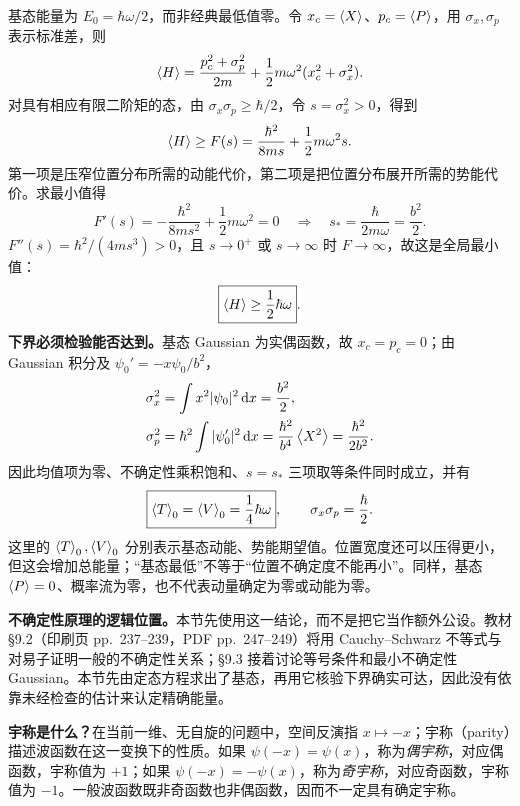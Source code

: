 基态能量为 $E_0=\hbar\omega/2$，而非经典最低值零。令
$x_c=\left\langle X \right\rangle$、$p_c=\left\langle P \right\rangle$，用 $\sigma_x,\sigma_p$ 表示标准差，则
\begin{equation}
  \left\langle H \right\rangle=\frac{p_c^2+\sigma_p^2}{2m}
               +\frac12m\omega^2(x_c^2+\sigma_x^2).
\end{equation}
对具有相应有限二阶矩的态，由 $\sigma_x\sigma_p\ge\hbar/2$，令 $s=\sigma_x^2>0$，得到
\begin{equation}
  \left\langle H \right\rangle\ge F(s)=\frac{\hbar^2}{8ms}+\frac12m\omega^2s.
\end{equation}
第一项是压窄位置分布所需的动能代价，第二项是把位置分布展开所需的势能代价。求最小值得
\begin{equation}
  F'(s)=-\frac{\hbar^2}{8ms^2}+\frac12m\omega^2=0
  \quad\Longrightarrow\quad s_* =\frac{\hbar}{2m\omega}=\frac{b^2}{2}.
\end{equation}
$F''(s)=\hbar^2/(4ms^3)>0$，且 $s\to0^+$ 或 $s\to\infty$ 时 $F\to\infty$，故这是全局最小值：
\begin{equation}
  \boxed{\left\langle H \right\rangle\ge\frac12\hbar\omega}.
\end{equation}
\textbf{下界必须检验能否达到。}基态 Gaussian 为实偶函数，故 $x_c=p_c=0$；由 Gaussian 积分及 $\psi_0'=-x\psi_0/b^2$，
\begin{align}
  \sigma_x^2&=\int x^2|\psi_0|^2\mathop{}\!\mathrm{d} x=\frac{b^2}{2},\\
  \sigma_p^2&=\hbar^2\int|\psi_0'|^2\mathop{}\!\mathrm{d} x
    =\frac{\hbar^2}{b^4}\left\langle X^2 \right\rangle=\frac{\hbar^2}{2b^2}.
\end{align}
因此均值项为零、不确定性乘积饱和、$s=s_*$ 三项取等条件同时成立，并有
\begin{equation}
  \boxed{\left\langle T \right\rangle_0=\left\langle V \right\rangle_0=\frac14\hbar\omega},\qquad
  \sigma_x\sigma_p=\frac\hbar2.
\end{equation}
这里的 $\left\langle T \right\rangle_0,\left\langle V \right\rangle_0$ 分别表示基态动能、势能期望值。位置宽度还可以压得更小，但这会增加总能量；“基态最低”不等于“位置不确定度不能再小”。同样，基态 $\left\langle P \right\rangle=0$、概率流为零，也不代表动量确定为零或动能为零。

\textbf{不确定性原理的逻辑位置。}本节先使用这一结论，而不是把它当作额外公设。教材 \S 9.2（印刷页 pp.~237--239，PDF pp.~247--249）将用 Cauchy--Schwarz 不等式与对易子证明一般的不确定性关系；\S 9.3 接着讨论等号条件和最小不确定性 Gaussian。本节先由定态方程求出了基态，再用它核验下界确实可达，因此没有依靠未经检查的估计来认定精确能量。

\textbf{宇称是什么？}在当前一维、无自旋的问题中，空间反演指 $x\mapsto-x$；宇称（parity）描述波函数在这一变换下的性质。如果 $\psi(-x)=\psi(x)$，称为\emph{偶宇称}，对应偶函数，宇称值为 $+1$；如果 $\psi(-x)=-\psi(x)$，称为\emph{奇宇称}，对应奇函数，宇称值为 $-1$。一般波函数既非奇函数也非偶函数，因而不一定具有确定宇称。

